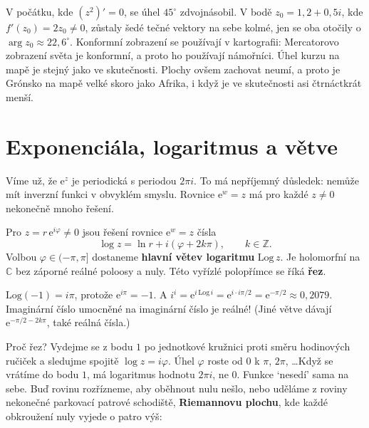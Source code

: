 V počátku, kde $(z^2)' = 0$, se úhel $45^\circ$ zdvojnásobil. V bodě $z_0 = 1{,}2 + 0{,}5i$, kde $f'(z_0) = 2z_0\neq 0$, zůstaly šedé tečné vektory na sebe kolmé, jen se oba otočily o $\arg z_0\approx 22{,}6^\circ$. Konformní zobrazení se používají v kartografii: Mercatorovo zobrazení světa je konformní, a proto ho používají námořníci. Úhel kurzu na mapě je stejný jako ve skutečnosti. Plochy ovšem zachovat neumí, a proto je Grónsko na mapě velké skoro jako Afrika, i když je ve skutečnosti asi čtrnáctkrát menší.

\section{Exponenciála, logaritmus a větve}

Víme už, že $\mathrm{e}^z$ je periodická s periodou $2\pi i$. To má nepříjemný důsledek: nemůže mít inverzní funkci v obvyklém smyslu. Rovnice $\mathrm{e}^w = z$ má pro každé $z\neq 0$ nekonečně mnoho řešení.

\begin{definitionbox}
  Pro $z = r\,\mathrm{e}^{i\varphi}\neq 0$ jsou řešení rovnice $\mathrm{e}^w = z$ čísla
  \begin{equation*}
    \log z = \ln r + i(\varphi + 2k\pi),\qquad k\in\mathbb{Z}.
  \end{equation*}
  Volbou $\varphi\in(-\pi, \pi]$ dostaneme \textbf{hlavní větev logaritmu} $\mathrm{Log}\,z$. Je holomorfní na $\mathbb{C}$ bez záporné reálné poloosy a nuly. Této vyřízlé polopřímce se říká \textbf{řez}.
\end{definitionbox}

\begin{example}
  $\mathrm{Log}(-1) = i\pi$, protože $\mathrm{e}^{i\pi} = -1$. A $i^i = \mathrm{e}^{i\,\mathrm{Log}\,i} = \mathrm{e}^{i\cdot i\pi/2} = \mathrm{e}^{-\pi/2}\approx 0{,}2079$. Imaginární číslo umocněné na imaginární číslo je reálné! (Jiné větve dávají $\mathrm{e}^{-\pi/2 - 2k\pi}$, také reálná čísla.)
\end{example}

Proč řez? Vydejme se z bodu $1$ po jednotkové kružnici proti směru hodinových ručiček a sledujme spojitě $\log z = i\varphi$. Úhel $\varphi$ roste od $0$ k $\pi$, $2\pi$, \dots Když se vrátíme do bodu $1$, má logaritmus hodnotu $2\pi i$, ne $0$. Funkce `nesedí' sama na sebe. Buď rovinu rozřízneme, aby oběhnout nulu nešlo, nebo uděláme z roviny nekonečné parkovací patrové schodiště, \textbf{Riemannovu plochu}, kde každé obkroužení nuly vyjede o patro výš:

